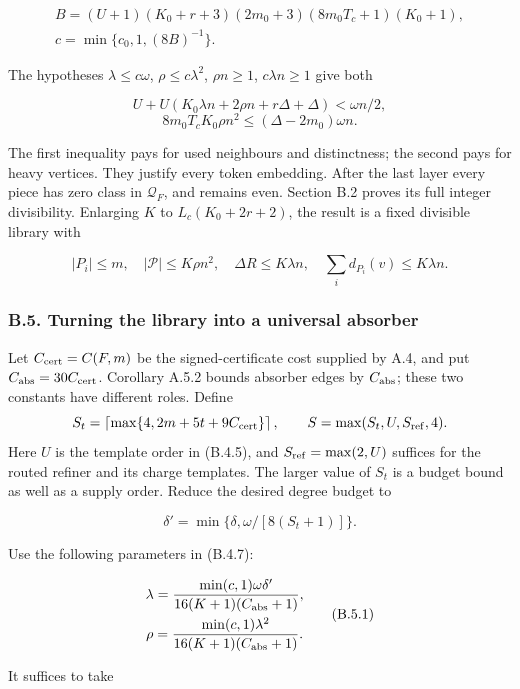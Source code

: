 \documentclass[english,11pt,a4paper]{article}
\begin{document}
\[\begin{gathered}
B=(U+1)(K_0+r+3)(2m_0+3)(8m_0T_c+1)(K_0+1),\\
c=\min\{c_0,1,(8B)^{-1}\}.
\end{gathered}
\tag{B.4.5}\]

The hypotheses \(\lambda\le c\omega\), \(\rho\le c\lambda^2\), \(\rho n\ge1\), \(c\lambda n\ge1\) give both

\[U+U(K_0\lambda n+2\rho n+r\Delta+\Delta)<\omega n/2,\] \[8m_0T_cK_0\rho n^2\le(\Delta-2m_0)\omega n.
\tag{B.4.6}\]

The first inequality pays for used neighbours and distinctness; the second pays for heavy vertices. They justify every token embedding. After the last layer every piece has zero class in \(\mathcal Q_F\), and remains even. Section B.2 proves its full integer divisibility. Enlarging \(K\) to \(L_c(K_0+2r+2)\), the result is a fixed divisible library with

\[|P_i|\le m,\quad |\mathcal P|\le K\rho n^2,\quad
\Delta R\le K\lambda n,\quad
\sum_i d_{P_i}(v)\le K\lambda n.
\tag{B.4.7}\]

\subsubsection{B.5. Turning the library into a universal absorber}\label{b.5.-turning-the-library-into-a-universal-absorber}

Let \(C_{\rm cert}=C(F,m)\) be the signed-certificate cost supplied by A.4, and put \(C_{\rm abs}=30C_{\rm cert}\). Corollary A.5.2 bounds absorber edges by \(C_{\rm abs}\); these two constants have different roles. Define \[S_t=\left\lceil\max\{4,2m+5t+9C_{\rm cert}\}\right\rceil,
\qquad S=\max(S_t,U,S_{\rm ref},4).\] Here \(U\) is the template order in (B.4.5), and \(S_{\rm ref}=\max(2,U)\) suffices for the routed refiner and its charge templates. The larger value of \(S_t\) is a budget bound as well as a supply order. Reduce the desired degree budget to

\[\delta'=\min\{\delta,\omega/[8(S_t+1)]\}.\]

Use the following parameters in (B.4.7):

\[\begin{gathered}
\lambda=\frac{\min(c,1)\omega\delta'}{16(K+1)(C_{\rm abs}+1)},\\
\rho=\frac{\min(c,1)\lambda^2}{16(K+1)(C_{\rm abs}+1)}.
\end{gathered}
\tag{B.5.1}\]

It suffices to take
\end{document}
